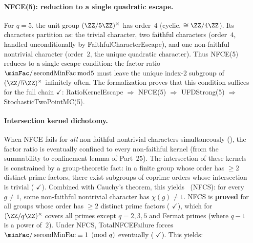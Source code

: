 \paragraph{NFCE(5): reduction to a single quadratic escape.}
For $q = 5$, the unit group $(\ZZ/5\ZZ)^\times$ has order~$4$
(cyclic, $\cong \ZZ/4\ZZ$).  Its characters partition as: the trivial
character, two faithful characters (order~$4$, handled unconditionally
by FaithfulCharacterEscape), and one non-faithful nontrivial character
(order~$2$, the unique quadratic character).  Thus NFCE(5) reduces to a
single escape condition: the factor ratio
$\minFac / \operatorname{secondMinFac} \bmod 5$ must leave the unique
index-2 subgroup of $(\ZZ/5\ZZ)^\times$ infinitely often.
The formalization proves that this
 condition suffices for the full chain
{\color{leanink}$\checkmark$}:
RatioKernelEscape $\Rightarrow$ NFCE(5) $\Rightarrow$ UFDStrong(5)
$\Rightarrow$ StochasticTwoPointMC(5).

\paragraph{Intersection kernel dichotomy.}
When NFCE fails for \emph{all} non-faithful nontrivial characters
simultaneously (), the factor ratio is
eventually confined to every non-faithful kernel (from the
summability-to-confinement lemma of Part~25).
The intersection of these kernels is constrained by a group-theoretic
fact: in a finite group whose order has $\geq 2$ distinct prime
factors, there exist subgroups of coprime orders whose intersection is
trivial
(
{\color{leanink}$\checkmark$}).  Combined with Cauchy's theorem, this
yields ~(NFCS): for every
$g \neq 1$, some non-faithful nontrivial character has $\chi(g) \neq 1$.
NFCS is
\textbf{proved} for all groups whose order has $\geq 2$ distinct prime
factors
(
{\color{leanink}$\checkmark$}), which for $(\ZZ/q\ZZ)^\times$ covers
all primes except $q = 2, 3, 5$ and Fermat primes (where $q - 1$ is a
power of~$2$).
Under NFCS, TotalNFCEFailure forces
$\minFac / \operatorname{secondMinFac} \equiv 1 \pmod{q}$ eventually
(
{\color{leanink}$\checkmark$}).
This yields:

